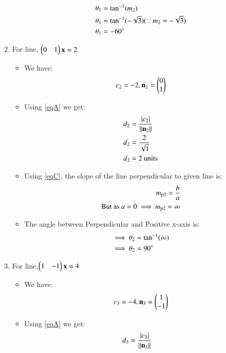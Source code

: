 \documentclass[journal,12pt,twocolumn]{IEEEtran}
\begin{document}
\begin{enumerate}
\begin{itemize}
 \begin{align}
  \theta\textsubscript{1} &= \tan^{-1}( m\textsubscript{2})
  \\
 \theta\textsubscript{1} &= \tan^{-1}(-\sqrt{3}) (\because m\textsubscript{2}=-\sqrt{3})
 \\
 \theta\textsubscript{1} &= -60\degree
\end{align}
\end{itemize}
\item For line, $\begin{pmatrix}0&1\end{pmatrix}\mathbf{x} =2$
\begin{itemize}
\item We have:
\begin{align}
 c\textsubscript{2}=-2 ,{\mathbf{n\textsubscript{2}}}=\begin{pmatrix}0\\1\end{pmatrix}   
\end{align}
\item Using \eqref{eqA} we get:
\begin{align}
d\textsubscript{2}&=\frac { \left| c\textsubscript{2} \right| }{\lVert\mathbf{n\textsubscript{2}}\rVert}
\\
d\textsubscript{2}&=\frac{2}{\sqrt{1}} 
\\
d\textsubscript{2}&=2 \text{ units}
\end{align}
\item Using \eqref{eqC}, the slope of the line perpendicular to given line is:
\begin{align}
  m\textsubscript{p2}=\frac{b}{a}
  \\
\text{But as } a=0 \implies m\textsubscript{p2}=\infty
\end{align}
\item The angle between Perpendicular and Positive x-axis is:
 \begin{align}
 \implies \theta\textsubscript{2} &= \tan^{-1}(\infty)
  \\
 \implies \theta\textsubscript{2} &= 90\degree
\end{align}
\end{itemize}
\item For line,$\begin{pmatrix}1&-1\end{pmatrix}\mathbf{x} =4$
\begin{itemize}
\item We have:
\begin{align}
 c\textsubscript{3}= -4 ,{\mathbf{n\textsubscript{3}}}=\begin{pmatrix}1\\-1\end{pmatrix}   
\end{align}
\item Using \eqref{eqA} we get:
\begin{align}
d\textsubscript{3}&=\frac { \left| c\textsubscript{3}\right| }{\norm{\vec{n\textsubscript{3}}}}

\end{align}
\end{itemize}
\end{enumerate}
\end{document}
